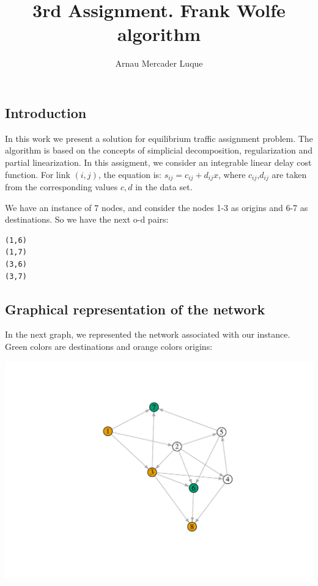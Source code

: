 \documentclass[]{article}
\title{3rd Assignment. Frank Wolfe algorithm}
\author{Arnau Mercader Luque}
\date{}
\begin{document}
\maketitle

\subsection{Introduction}\label{introduction}

In this work we present a solution for equilibrium traffic assignment
problem. The algorithm is based on the concepts of simplicial
decomposition, regularization and partial linearization. In this
assigment, we consider an integrable linear delay cost function. For
link \((i,j)\), the equation is: \(s_{ij} = c_{ij} + d_{ij} x\), where
\(c_{ij}\),\(d_{ij}\) are taken from the corresponding values \(c,d\) in
the data set.

We have an instance of 7 nodes, and consider the nodes 1-3 as origins
and 6-7 as destinations. So we have the next o-d pairs:

\begin{verbatim}
(1,6)
(1,7)
(3,6)
(3,7)
\end{verbatim}

\subsection{Graphical representation of the
network}\label{graphical-representation-of-the-network}

In the next graph, we represented the network associated with our
instance. Green colors are destinations and orange colors origins:

\includegraphics{report_pdf_files/figure-latex/unnamed-chunk-1-1.pdf}
\end{document}
